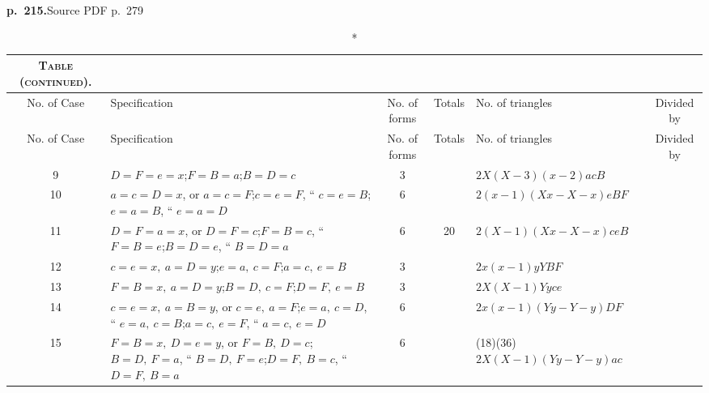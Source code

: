 \documentclass[11pt,a4paper]{article}
\newcommand{\sourcepage}[2]{\par\bigskip\noindent\textbf{p.~#1.}\hfill{\footnotesize Source PDF p.~#2}\par\nobreak\medskip}
\begin{document}
\clearpage
\sourcepage{215}{279}
\begin{landscape}
\begin{center}
\small
\begin{longtable}{c p{8.2cm} c c p{8.2cm} c}
\caption*{\textsc{Table (continued).}}\\
\toprule
No. of Case&Specification&No. of forms&Totals&No. of triangles&Divided by\\
\midrule
\endfirsthead
\toprule
No. of Case&Specification&No. of forms&Totals&No. of triangles&Divided by\\
\midrule
\endhead
9&$D=F=e=x$;\quad $F=B=a$;\quad $B=D=c$&3&&$2X(X-3)(x-2)acB$&\\
10&$a=c=D=x$, or $a=c=F$;\quad $c=e=F$, `` $c=e=B$;\quad $e=a=B$, `` $e=a=D$&6&&$2(x-1)(Xx-X-x)eBF$&\\
11&$D=F=a=x$, or $D=F=c$;\quad $F=B=c$, `` $F=B=e$;\quad $B=D=e$, `` $B=D=a$&6&20&$2(X-1)(Xx-X-x)ceB$&\\
12&$c=e=x,\ a=D=y$;\quad $e=a,\ c=F$;\quad $a=c,\ e=B$&3&&$2x(x-1)yYBF$&\\
13&$F=B=x,\ a=D=y$;\quad $B=D,\ c=F$;\quad $D=F,\ e=B$&3&&$2X(X-1)Yyce$&\\
14&$c=e=x,\ a=B=y$, or $c=e,\ a=F$;\quad $e=a,\ c=D$, `` $e=a,\ c=B$;\quad $a=c,\ e=F$, `` $a=c,\ e=D$&6&&$2x(x-1)(Yy-Y-y)DF$&\\
15&$F=B=x,\ D=e=y$, or $F=B,\ D=c$;\quad $B=D,\ F=a$, `` $B=D,\ F=e$;\quad $D=F,\ B=c$, `` $D=F,\ B=a$&6&&(18)\quad (36)\quad $2X(X-1)(Yy-Y-y)ac$&\\
\bottomrule
\end{longtable}
\end{center}
\end{landscape}
\end{document}
